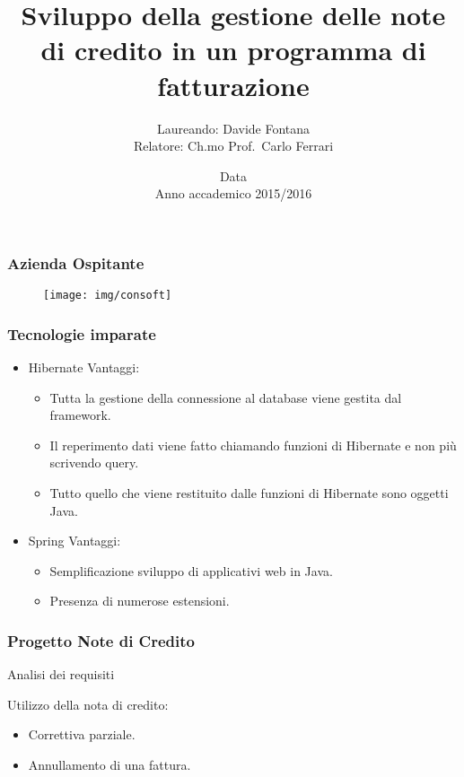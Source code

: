 \documentclass[]{beamer}
\title[Note di credito]{Sviluppo della gestione delle note di credito in un
programma di fatturazione}
\author[Davide Fontana]{Laureando: Davide Fontana \\Relatore: Ch.mo Prof.\ Carlo Ferrari }
\date[Data pié di pagina]{Data \\ Anno accademico 2015/2016}
\institute[DEI Unipd]{Corso di Laurea in Ingegneria Informatica\\ Department of Information Engineering}
\begin{document}
    \frame{\titlepage}

    \begin{frame}
        \frametitle{Azienda Ospitante}
        \begin{figure}[H]
            \centering
            \texttt{[image: img/consoft]}\label{logo:consoft}
        \end{figure}
    \end{frame}

    \begin{frame}
        \frametitle{Tecnologie imparate}
        \begin{itemize}
            \item Hibernate
                \newline
                Vantaggi:
                \begin{itemize}
                    \item Tutta la gestione della connessione al database viene 
                        gestita dal framework.
                    \item Il reperimento dati viene fatto chiamando funzioni di 
                        Hibernate e non più scrivendo query. 
                    \item Tutto quello che viene restituito dalle funzioni di 
                        Hibernate sono oggetti Java.
                \end{itemize}
            \item Spring
                \newline
                Vantaggi:
                \begin{itemize}
                    \item Semplificazione sviluppo di applicativi web in Java.
                    \item Presenza di numerose estensioni.
                \end{itemize}
        \end{itemize}
    \end{frame}

    \begin{frame}
        \frametitle{Progetto Note di Credito}
        \begin{LARGE}
            Analisi dei requisiti 
        \end{LARGE}
        \newline
        \newline
        Utilizzo della nota di credito:
        \begin{itemize}
            \item Correttiva parziale.
            \item Annullamento di una fattura.
        \end{itemize}
    \end{frame}
\end{document}
